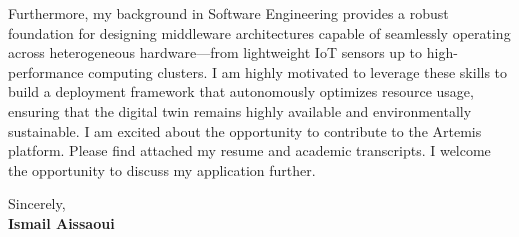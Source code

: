 \documentclass[11pt,a4paper]{article}
\begin{document}
\vspace{0.5em}
\noindent
Furthermore, my background in Software Engineering provides a robust foundation for designing middleware architectures capable of seamlessly operating across heterogeneous hardware---from lightweight IoT sensors up to high-performance computing clusters. I am highly motivated to leverage these skills to build a deployment framework that autonomously optimizes resource usage, ensuring that the digital twin remains highly available and environmentally sustainable. I am excited about the opportunity to contribute to the Artemis platform. Please find attached my resume and academic transcripts. I welcome the opportunity to discuss my application further.

\vspace{1.5em}
\noindent
Sincerely, \\[0.5em]
\textbf{Ismail Aissaoui}
\end{document}
